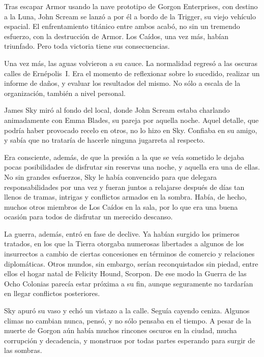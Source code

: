 \begin{prev}
    Tras escapar Armor usando la nave prototipo de Gorgon Enterprises, con destino a la Luna, John Scream se lanzó a por él a bordo de la Trigger, su viejo vehículo espacial. El enfrentamiento titánico entre ambos acabó, no sin un tremendo esfuerzo, con la destrucción de Armor. Los Caídos, una vez más, habían triunfado. Pero toda victoria tiene sus consecuencias.
\end{prev}

\noindent
Una vez más, las aguas volvieron a su cauce. La normalidad regresó a las oscuras calles de Ernépolis~I. Era el momento de reflexionar sobre lo sucedido, realizar un informe de daños, y evaluar los resultados del mismo. No sólo a escala de la organización, también a nivel personal.

\bigskip\noindent
James Sky miró al fondo del local, donde John Scream estaba charlando animadamente con Emma Blades, su pareja por aquella noche. Aquel detalle, que podría haber provocado recelo en otros, no lo hizo en Sky. Confiaba en su amigo, y sabía que no trataría de hacerle ninguna jugarreta al respecto.

Era consciente, además, de que la presión a la que se veía sometido le dejaba pocas posibilidades de disfrutar sin reservas una noche, y aquella era una de ellas. No sin grandes esfuerzos, Sky le había convencido para que delegara responsabilidades por una vez y fueran juntos a relajarse después de días tan llenos de tramas, intrigas y conflictos armados en la sombra. Había, de hecho, muchos otros miembros de Los Caídos en la sala, por lo que era una buena ocasión para todos de disfrutar un merecido descanso.

La guerra, además, entró en fase de declive. Ya habían surgido los primeros tratados, en los que la Tierra otorgaba numerosas libertades a algunos de los insurrectos a cambio de ciertas concesiones en términos de comercio y relaciones diplomáticas. Otros mundos, sin embargo, serían reconquistados sin piedad, entre ellos el hogar natal de Felicity Hound, Scorpon. De ese modo la Guerra de las Ocho Colonias parecía estar próxima a su fin, aunque seguramente no tardarían en llegar conflictos posteriores.

Sky apuró su vaso y echó un vistazo a la calle. Seguía cayendo ceniza. Algunos climas no cambian nunca, pensó, y no sólo pensaba en el tiempo. A pesar de la muerte de Gorgon aún había muchos rincones oscuros en la ciudad, mucha corrupción y decadencia, y monstruos por todas partes esperando para surgir de las sombras.


